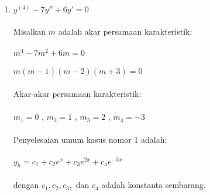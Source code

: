 \begin{enumerate}[1.]

	\item \begin{math} y^{(4)} - 7y'' + 6y' = 0 \end{math} \\ \\
	Misalkan \begin{math} m \end{math} adalah akar persamaan karakteristik: \\ \\
	\begin{math} m^{4} - 7m^{2} + 6m = 0 \end{math} \\ \\
	\begin{math} m (m - 1)(m - 2)(m + 3) = 0 \end{math} \\ \\
	Akar-akar persamaan karakteristik: \\ \\
	\begin{math} m_1 = 0 \end{math} , \begin{math} m_2 = 1 \end{math} , \begin{math} m_3 = 2 \end{math} , \begin{math} m_4 = -3 \end{math} \\ \\
	Penyelesaian umum kasus nomor 1 adalah: \\ \\
	\begin{math} y_h = c_1 + c_2 e^{x} + c_3 e^{2x} + c_4 e^{-3x} \end{math} \\ \\
	dengan \begin{math} c_1, c_2, c_3, \end{math} dan \begin{math} c_4 \end{math} adalah konstanta sembarang.


\end{enumerate}
